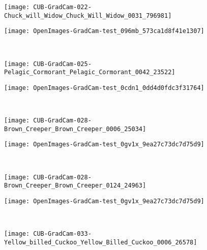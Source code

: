 \documentclass[twocolumn]{article}
\theoremstyle{definition}
\begin{document}
\begin{figure*}
\begin{subfigure}[b]{0.49\textwidth}
         \centering
         \texttt{[image: CUB-GradCam-022-Chuck\_will\_Widow\_Chuck\_Will\_Widow\_0031\_796981]}
     \end{subfigure}
     \hfill
     \begin{subfigure}[b]{0.49\textwidth}
         \centering
         \texttt{[image: OpenImages-GradCam-test\_096mb\_573ca1d8f41e1307]}
     \end{subfigure}
     \\
     \vspace{0.1cm}
     \begin{subfigure}[b]{0.49\textwidth}
         \centering
         \texttt{[image: CUB-GradCam-025-Pelagic\_Cormorant\_Pelagic\_Cormorant\_0042\_23522]}
     \end{subfigure}
     \hfill
     \begin{subfigure}[b]{0.49\textwidth}
         \centering
         \texttt{[image: OpenImages-GradCam-test\_0cdn1\_0dd4d0fdc3f31764]}
     \end{subfigure}
      \\
     \vspace{0.1cm}
     \begin{subfigure}[b]{0.49\textwidth}
         \centering
         \texttt{[image: CUB-GradCam-028-Brown\_Creeper\_Brown\_Creeper\_0006\_25034]}
     \end{subfigure}
     \hfill
     \begin{subfigure}[b]{0.49\textwidth}
         \centering
         \texttt{[image: OpenImages-GradCam-test\_0gv1x\_9ea27c73dc7d75d9]}
     \end{subfigure}
      \\
     \vspace{0.1cm}
     \begin{subfigure}[b]{0.49\textwidth}
         \centering
         \texttt{[image: CUB-GradCam-028-Brown\_Creeper\_Brown\_Creeper\_0124\_24963]}
     \end{subfigure}
     \hfill
     \begin{subfigure}[b]{0.49\textwidth}
         \centering
         \texttt{[image: OpenImages-GradCam-test\_0gv1x\_9ea27c73dc7d75d9]}
     \end{subfigure}
      \\
     \vspace{0.1cm}
     \begin{subfigure}[b]{0.49\textwidth}
         \centering
         \texttt{[image: CUB-GradCam-033-Yellow\_billed\_Cuckoo\_Yellow\_Billed\_Cuckoo\_0006\_26578]}

\end{subfigure}
\end{figure*}
\end{document}
